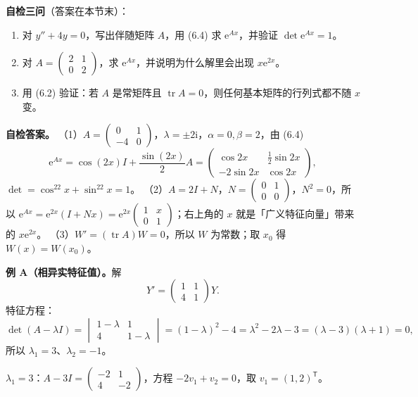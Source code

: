 \documentclass[11pt]{ctexart}
\let\origsubhdr\subhdr
\renewcommand{\subhdr}[1]{\needspace{3\baselineskip}\origsubhdr{#1}}
\newcommand{\tr}{\operatorname{tr}}
\newcommand{\ii}{\mathrm{i}}
\newcommand{\ee}{\mathrm{e}}
\begin{document}
\textbf{自检三问}（答案在本节末）：
\begin{enumerate}
  \item 对 $y''+4y=0$，写出伴随矩阵 $A$，用 (6.4) 求 $\ee^{Ax}$，并验证 $\det\ee^{Ax}=1$。
  \item 对 $A=\begin{pmatrix}2&1\\0&2\end{pmatrix}$，求 $\ee^{Ax}$，并说明为什么解里会出现 $x\ee^{2x}$。
  \item 用 (6.2) 验证：若 $A$ 是常矩阵且 $\tr A=0$，则任何基本矩阵的行列式都不随 $x$ 变。
\end{enumerate}

\textbf{自检答案。}
（1）$A=\begin{pmatrix}0&1\\-4&0\end{pmatrix}$，$\lambda=\pm2\ii$，$\alpha=0,\beta=2$，由 (6.4)
\[
\ee^{Ax}=\cos(2x)I+\frac{\sin(2x)}{2}A
=\begin{pmatrix}\cos2x&\frac12\sin2x\\-2\sin2x&\cos2x\end{pmatrix},
\]
$\det=\cos^22x+\sin^22x=1$。
（2）$A=2I+N$，$N=\begin{pmatrix}0&1\\0&0\end{pmatrix}$，$N^2=0$，所以 $\ee^{Ax}=\ee^{2x}(I+Nx)=\ee^{2x}\begin{pmatrix}1&x\\0&1\end{pmatrix}$；右上角的 $x$ 就是「广义特征向量」带来的 $x\ee^{2x}$。
（3）$W'=(\tr A)W=0$，所以 $W$ 为常数；取 $x_0$ 得 $W(x)=W(x_0)$。


\textbf{例 A（相异实特征值）。}解
\[
Y'=\begin{pmatrix}1&1\\4&1\end{pmatrix}Y .
\]
特征方程：
\[
\det(A-\lambda I)=\begin{vmatrix}1-\lambda&1\\4&1-\lambda\end{vmatrix}
=(1-\lambda)^2-4=\lambda^2-2\lambda-3=(\lambda-3)(\lambda+1)=0,
\]
所以 $\lambda_1=3$、$\lambda_2=-1$。

$\lambda_1=3$：$A-3I=\begin{pmatrix}-2&1\\4&-2\end{pmatrix}$，方程 $-2v_1+v_2=0$，取 $v_1=(1,2)^{\mathsf T}$。
\end{document}
